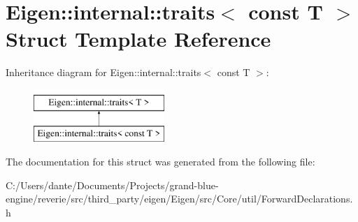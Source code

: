 \hypertarget{struct_eigen_1_1internal_1_1traits_3_01const_01_t_01_4}{}\section{Eigen\+::internal\+::traits$<$ const T $>$ Struct Template Reference}
\label{struct_eigen_1_1internal_1_1traits_3_01const_01_t_01_4}
Inheritance diagram for Eigen\+::internal\+::traits$<$ const T $>$\+:\begin{figure}[H]
\begin{center}
\leavevmode
\includegraphics[height=2.000000cm]{struct_eigen_1_1internal_1_1traits_3_01const_01_t_01_4}
\end{center}
\end{figure}


The documentation for this struct was generated from the following file\+:\begin{DoxyCompactItemize}
\item 
C\+:/\+Users/dante/\+Documents/\+Projects/grand-\/blue-\/engine/reverie/src/third\+\_\+party/eigen/\+Eigen/src/\+Core/util/Forward\+Declarations.\+h\end{DoxyCompactItemize}
